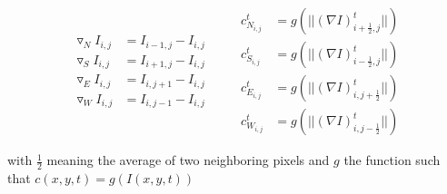\documentclass{article}
\begin{document}
\begin{equation}
  \begin{split}
    \triangledown_N I_{i,j} &= I_{i-1,j}-I_{i,j}\\
    \triangledown_S I_{i,j} &= I_{i+1,j}-I_{i,j}\\
    \triangledown_E I_{i,j} &= I_{i,j+1}-I_{i,j}\\
    \triangledown_W I_{i,j} &= I_{i,j-1}-I_{i,j}
  \end{split}
\quad\quad
  \begin{split}
    c_{N_{i,j}}^t &= g(||(\nabla I)_{i+\frac{1}{2},j}^t||)\\
    c_{S_{i,j}}^t &= g(||(\nabla I)_{i-\frac{1}{2},j}^t||)\\
    c_{E_{i,j}}^t &= g(||(\nabla I)_{i,j+\frac{1}{2}}^t||)\\
    c_{W_{i,j}}^t &= g(||(\nabla I)_{i,j-\frac{1}{2}}^t||)
  \end{split}
\end{equation}

with $\frac{1}{2}$ meaning the average of two neighboring pixels and $g$ the function such that $c(x,y,t)=g(I(x,y,t))$





\end{document}
